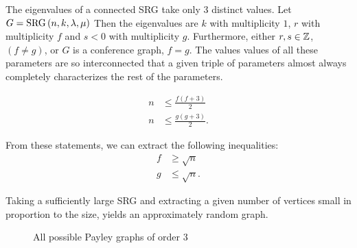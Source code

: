 \begin{recall}
	The eigenvalues of a connected SRG take only \(3\) distinct values. Let \( G = \operatorname{SRG}\left( n, k, \lambda, \mu \right) \) Then the eigenvalues are \(k\) with multiplicity \(1\), \(r\) with multiplicity \(f\) and \(s< 0\) with multiplicity \(g\). Furthermore, either \(r, s \in \mathbb{Z}\), \( \left( f \neq g \right) \), or  \(G\) is  a conference graph, \(f = g\). The values values of all these parameters are so interconnected that a given triple of parameters almost always completely characterizes the rest of the parameters.
\end{recall}
\begin{theorem}[Seidel]
	\begin{align*}
		n &\le \frac{f\left( f+3 \right) }{2} \\
		  n&\le \frac{g\left( g+3 \right) }{2}
	.\end{align*}
\end{theorem}
From these statements, we can extract the following inequalities:
\begin{align*}
	f&\ge \sqrt{n} \\
	g &\le \sqrt{n}
.\end{align*}
\begin{remark}
	Taking a sufficiently large SRG and extracting a given number of vertices small in proportion to the size, yields an approximately random graph.
\end{remark}
\begin{figure}[ht]
    \centering
    \caption{All possible Payley graphs of order \(3\)}
    \label{fig:payley}
\end{figure}


